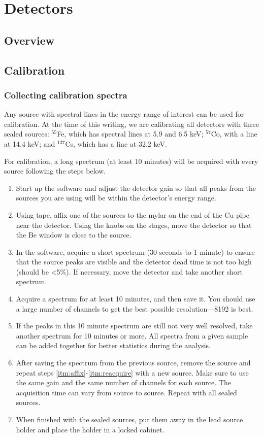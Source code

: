 \chapter{Detectors\label{chap:calib}}

\section{Overview}



\section{Calibration}

\subsection{Collecting calibration spectra}

Any source with spectral lines in the energy range of interest can be
used for calibration. At the time of this writing, we are calibrating
all detectors with three sealed sources: $^{55}$Fe, which has spectral
lines at 5.9 and 6.5 keV; $^{57}$Co, with a line at 14.4 keV; and
$^{137}$Cs, which has a line at 32.2 keV.

For calibration, a long spectrum (at least 10 minutes) will be
acquired with every source following the steps below.
\begin{enumerate}
\item Start up the software and adjust the detector gain so that all
  peaks from the sources you are using will be within the detector's
  energy range.
\item \label{itm:affix} Using tape, affix one of the sources to the
  mylar on the end of the Cu pipe near the detector. Using the knobs
  on the stages, move the detector so that the Be window is close to
  the source.
\item In the software, acquire a short spectrum (30 seconds to 1
  minute) to ensure that the source peaks are visible and the detector
  dead time is not too high (should be <5\%). If necessary, move the
  detector and take another short spectrum.
\item \label{itm:acquire} Acquire a spectrum for at least 10 minutes,
  and then save it. You should use a large number of channels to get
  the best possible resolution---8192 is best.
\item \label{itm:reacquire} If the peaks in this 10 minute spectrum
  are still not very well resolved, take another spectrum for 10
  minutes or more. All spectra from a given sample can be added
  together for better statistics during the analysis.
\item After saving the spectrum from the previous source, remove the
  source and repeat steps \ref{itm:affix}-\ref{itm:reacquire} with a new
  source. Make sure to use the same gain and the same number of
  channels for each source. The acquisition time can vary from source
  to source. Repeat with all sealed sources.
\item When finished with the sealed sources, put them away in the lead
  source holder and place the holder in a locked cabinet.
\end{enumerate}
  
